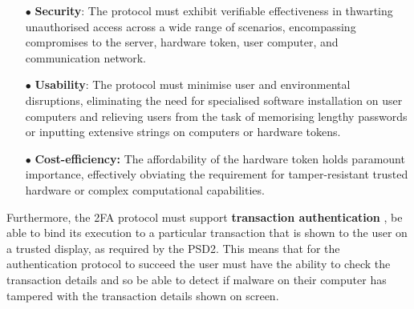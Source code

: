 \begin{itemize}

\item[$\bullet$]\textbf{Security}: The protocol must exhibit verifiable effectiveness in thwarting unauthorised access across a wide range of scenarios, encompassing compromises to the server, hardware token, user computer, and communication network.



\item[$\bullet$]\textbf{Usability}: The protocol must minimise user and environmental disruptions, eliminating the need for specialised software installation on user computers and relieving users from the task of memorising lengthy passwords or inputting extensive strings on computers or hardware tokens.

%

\item[$\bullet$]\textbf{Cost-efficiency:} The affordability of the hardware token holds paramount importance, effectively obviating the requirement for tamper-resistant trusted hardware or complex computational capabilities.



\end{itemize}

Furthermore, the 2FA protocol must support \textbf{transaction authentication} \ie, be able to bind its execution to a particular transaction that is shown to the user on a trusted display, as required by the PSD2.
This means that for the authentication protocol to succeed the user must have the ability to check the transaction details and so be able to detect if malware on their computer has tampered with the transaction details shown on screen.



